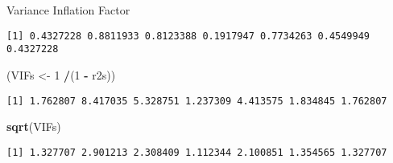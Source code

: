 \documentclass[
  ignorenonframetext,
]{beamer}
\newenvironment{Shaded}{\begin{snugshade}}{\end{snugshade}}
\newcommand{\DecValTok}[1]{\textcolor[rgb]{0.00,0.00,0.81}{#1}}
\newcommand{\FunctionTok}[1]{\textcolor[rgb]{0.13,0.29,0.53}{\textbf{#1}}}
\newcommand{\NormalTok}[1]{#1}
\newcommand{\OtherTok}[1]{\textcolor[rgb]{0.56,0.35,0.01}{#1}}
\newcommand{\SpecialCharTok}[1]{\textcolor[rgb]{0.81,0.36,0.00}{\textbf{#1}}}
\begin{document}
\begin{frame}[fragile]{Variance Inflation Factor}
\begin{verbatim}
[1] 0.4327228 0.8811933 0.8123388 0.1917947 0.7734263 0.4549949 0.4327228
\end{verbatim}

\begin{Shaded}
\begin{Highlighting}[]
\NormalTok{(VIFs }\OtherTok{\textless{}{-}} \DecValTok{1} \SpecialCharTok{/}\NormalTok{(}\DecValTok{1} \SpecialCharTok{{-}}\NormalTok{ r2s))}
\end{Highlighting}
\end{Shaded}

\begin{verbatim}
[1] 1.762807 8.417035 5.328751 1.237309 4.413575 1.834845 1.762807
\end{verbatim}

\begin{Shaded}
\begin{Highlighting}[]
\FunctionTok{sqrt}\NormalTok{(VIFs)}
\end{Highlighting}
\end{Shaded}

\begin{verbatim}
[1] 1.327707 2.901213 2.308409 1.112344 2.100851 1.354565 1.327707
\end{verbatim}

\normalsize
\end{frame}
\end{document}
